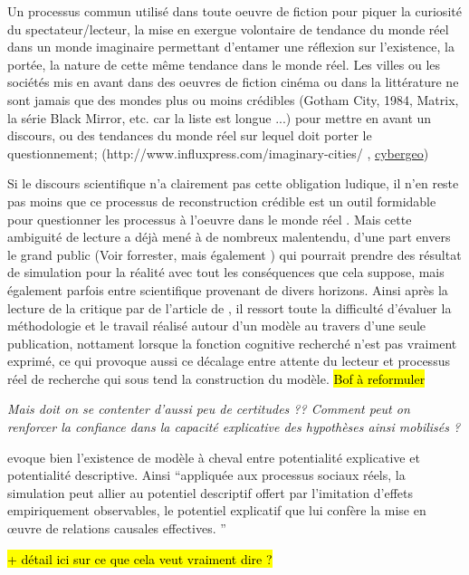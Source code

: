 Un processus commun utilisé dans toute oeuvre de fiction pour piquer la curiosité du spectateur/lecteur, la mise en exergue volontaire de tendance du monde réel dans un monde imaginaire permettant d'entamer une réflexion sur l'existence, la portée, la nature de cette même tendance dans le monde réel. Les villes ou les sociétés mis en avant dans des oeuvres de fiction cinéma ou dans la littérature ne sont jamais que des mondes plus ou moins crédibles (Gotham City, 1984, Matrix, la série Black Mirror, etc. car la liste est longue ...)  pour mettre en avant un discours, ou des tendances du monde réel sur lequel doit porter le questionnement; (http://www.influxpress.com/imaginary-cities/ ,  \href{http://cybergeo.revues.org/1170#tocto1n9?}{cybergeo})

Si le discours scientifique n'a clairement pas cette obligation ludique, il n'en reste pas moins que ce processus de reconstruction crédible est un outil formidable pour questionner les processus à l'oeuvre dans le monde réel . Mais cette ambiguité de lecture a déjà mené à de nombreux malentendu, d'une part envers le grand public (Voir forrester, mais également ) qui pourrait prendre des résultat de simulation pour la réalité avec tout les conséquences que cela suppose, mais également parfois entre scientifique provenant de divers horizons. Ainsi après la lecture de la critique par \textcite{Chattoe2011} de l'article de \textcite{Yanoff2009}, il ressort toute la difficulté d'évaluer la méthodologie et le travail réalisé autour d'un modèle au travers d'une seule publication, nottament lorsque la fonction cognitive recherché n'est pas vraiment exprimé, ce qui provoque aussi ce décalage entre attente du lecteur et processus réel de recherche qui sous tend la construction du modèle. \hl{Bof à reformuler}

\textit{Mais doit on se contenter d'aussi peu de certitudes ?? Comment peut on renforcer la confiance dans la capacité explicative des hypothèses ainsi mobilisés ? }

\textcite{Bulle2005} evoque bien l'existence de modèle à cheval entre potentialité explicative et potentialité descriptive. Ainsi \enquote{appliquée aux processus sociaux réels, la simulation peut allier au potentiel descriptif offert par l’imitation d’effets empiriquement observables, le potentiel explicatif que lui confère la mise en œuvre de relations causales effectives. }

\hl{+ détail ici sur ce que cela veut vraiment dire ? }

